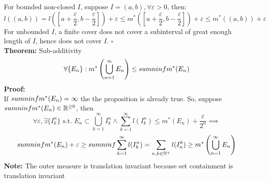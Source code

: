 \documentclass{article}
\newcommand{\R}{\mathbb{R}}
\newcommand{\N}{\mathbb{N}}
\newcommand{\sumninf}{\sum\limits_{n=1}^\infty}
\newcommand{\infcup}{\bigcup\limits_{n=1}^\infty}
\newcommand{\st}{\mbox{ s.t. }}
\newcommand{\0}{{\bf{0}}}
\newcommand{\1}{{\bf{1}}}
\begin{document}
For bounded non-closed $I$, suppose $I=(a,b),\forall\varepsilon>0$, then:
$$l((a,b))=l\left(\left[a+\dfrac{\varepsilon}{2},b-\dfrac{\varepsilon}{2}\right]\right)+\varepsilon\le m^*\left(\left[a+\dfrac{\varepsilon}{2},b-\dfrac{\varepsilon}{2}\right]\right)+\varepsilon\le m^*((a,b))+\varepsilon$$
For unbounded $I$, a finite cover does not cover a subinterval of great enough length of $I$, hence does not cover $I$. $\square$\\
\textbf{Theorem:} Sub-additivity
$$\forall \{E_n\}:m^*\left(\infcup E_n\right)\le\\sumninf m^*(E_n)$$
\textbf{Proof:}\\
If $\\sumninf m^*(E_n)=\infty$ the the proposition is already true. So, suppose $\\sumninf m^*(E_n)\in\R^{\geq0}$, then
$$\forall\varepsilon,\exists\{I_k^n\}\st E_n\subset\bigcup_{k=1}^\infty I_k^n\land\sum_{k=1}^\infty l(I_k^n)\le m^*(E_n)+\frac{\varepsilon}{2^n}\implies$$
$$\\sumninf m^*(E_n)+\varepsilon\geq\\sumninf\sum_{k=1}^\infty l(I_k^n)=\sum_{n,k\in\N^+}l(I_n^k)\geq m^*\left(\infcup E_n\right)$$
\textbf{Note:} The outer measure is translation invariant because set containment is translation invariant
\end{document}
